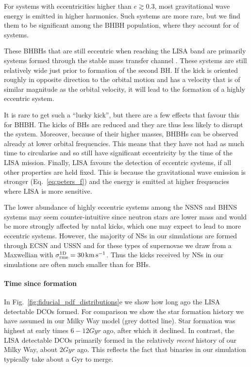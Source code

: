 For systems with eccentricities higher than $e\gtrsim0.3$, most gravitational wave energy is emitted in higher harmonics. Such systems are more rare, but we find them to be significant among the BHBH population, where they account for \BHBHHighlyEccentric{} of systems.

These BHBHs that are still eccentric when reaching the LISA band are primarily systems formed through the stable mass transfer channel \citep{vandenHeuvel+2017}. These systems are still relatively wide just prior to formation of the second BH. If the kick is oriented roughly in opposite direction to the orbital motion and has a velocity that is of similar magnitude as the orbital velocity, it will lead to the formation of a highly eccentric system. 

It is rare to get such a ``lucky kick'', but there are a few effects that favour this for BHBH. The kicks of BHs are reduced and they are thus less likely to disrupt the system.  Moreover, because of their higher masses, BHBHs can be observed already at lower orbital frequencies. This means that they have not had as much time to circularise and so still have significant eccentricity by the time of the LISA mission. Finally, LISA favours the detection of eccentric systems, if all other properties are held fixed. This is because the gravitational wave emission is stronger (Eq.~\ref{eq:peters_f}) and the energy is emitted at higher frequencies \citep[Eq.~20]{Peters+1963} where LISA is more sensitive.

The lower abundance of highly eccentric systems among the NSNS and BHNS systems may seem counter-intuitive since neutron stars are lower mass and would be more strongly affected by natal kicks, which one may expect to lead to more eccentric systems. However, the majority of NSs in our simulations are formed through ECSN and USSN and for these types of supernovae we draw from a Maxwellian with $\sigma_{\rm rms}^{\rm 1D} = 30 \unit{km}{s^{-1}}$. Thus the kicks received by NSs in our simulations are often much smaller than for BHs.

\paragraph{Time since formation} 
In Fig.~\ref{fig:fiducial_pdf_distributions}e we show how long ago the LISA detectable DCOs formed. For comparison we show the star formation history we have assumed in our Milky Way model (grey dotted line). Star formation was highest at early times $6-12\unit{Gyr}$ ago, after which it declined. In contrast, the LISA detectable DCOs primarily formed in the relatively \textit{recent} history of our Milky Way, about $2 \unit{Gyr}$ ago. This reflects the fact that binaries in our simulation typically take about a Gyr to merge.


